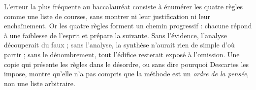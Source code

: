 \documentclass[11pt]{article}
\newcommand{\cle}[1]{{\popxbold\color{popdark}#1}}
\begin{document}
\begin{attention}
L'erreur la plus fréquente au baccalauréat consiste à énumérer les quatre règles comme une liste de courses, sans montrer ni leur justification ni leur enchaînement. Or les quatre règles forment un \cle{chemin progressif} : chacune répond à une faiblesse de l'esprit et prépare la suivante. Sans l'évidence, l'analyse découperait du faux ; sans l'analyse, la synthèse n'aurait rien de simple d'où partir ; sans le dénombrement, tout l'édifice resterait exposé à l'omission. Une copie qui présente les règles dans le désordre, ou sans dire pourquoi Descartes les impose, montre qu'elle n'a pas compris que la méthode est un \emph{ordre de la pensée}, non une liste arbitraire.
\end{attention}
\end{document}
